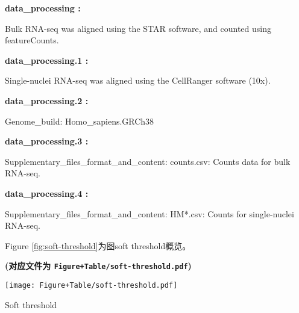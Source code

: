 \documentclass[
]{article}
\begin{document}
\begin{center}\begin{tcolorbox}[colback=gray!10, colframe=gray!50, width=0.9\linewidth, arc=1mm, boxrule=0.5pt]
\textbf{
data\_processing
:}

\vspace{0.5em}

    Bulk RNA-seq was aligned using the STAR software, and
counted using featureCounts.

\vspace{2em}


\textbf{
data\_processing.1
:}

\vspace{0.5em}

    Single-nuclei RNA-seq was aligned using the CellRanger
software (10x).

\vspace{2em}


\textbf{
data\_processing.2
:}

\vspace{0.5em}

    Genome\_build: Homo\_sapiens.GRCh38

\vspace{2em}


\textbf{
data\_processing.3
:}

\vspace{0.5em}

    Supplementary\_files\_format\_and\_content: counts.csv:
Counts data for bulk RNA-seq.

\vspace{2em}


\textbf{
data\_processing.4
:}

\vspace{0.5em}

    Supplementary\_files\_format\_and\_content: HM*.csv: Counts
for single-nuclei RNA-seq.

\vspace{2em}
\end{tcolorbox}
\end{center}

Figure \ref{fig:soft-threshold}为图soft threshold概览。

\textbf{(对应文件为 \texttt{Figure+Table/soft-threshold.pdf})}

\def\@captype{figure}
\begin{center}
\texttt{[image: Figure+Table/soft-threshold.pdf]}
\caption{Soft threshold}\label{fig:soft-threshold}
\end{center}
\end{document}
